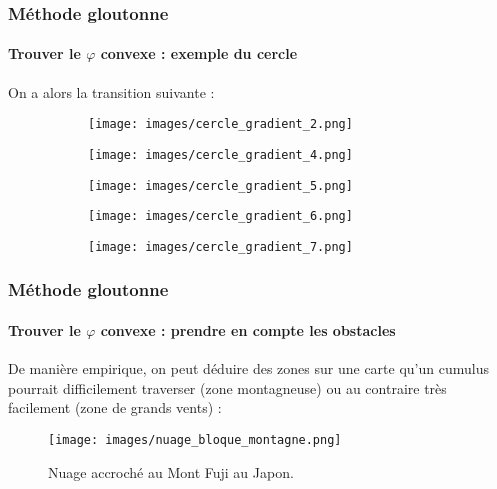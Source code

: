 \documentclass{beamer}
\begin{document}
\begin{frame}
	
		\frametitle{Méthode gloutonne}
		\framesubtitle{Trouver le $\varphi$ convexe : exemple du cercle}
		On a alors la transition suivante :
		\begin{figure}[!htb]
			\centering 
			\begin{subfigure}{0.25\textwidth}
				\centering 
				\texttt{[image: images/cercle\_gradient\_2.png]}
			\end{subfigure}
			\hspace*{\fill}
			\begin{subfigure}{0.25\textwidth}
				\centering 
				\texttt{[image: images/cercle\_gradient\_4.png]}
			\end{subfigure}
			\hspace*{\fill}
			\begin{subfigure}{0.25\textwidth}
				\centering 
				\texttt{[image: images/cercle\_gradient\_5.png]}
			\end{subfigure}
			\hspace*{\fill}
			
		\end{figure}
		\begin{figure}[!htb]

			\centering 
			\hspace*{\fill}
			\begin{subfigure}{0.25\textwidth}
				\centering 
				\texttt{[image: images/cercle\_gradient\_6.png]}
			\end{subfigure}
			\hspace*{\fill}
			\begin{subfigure}{0.25\textwidth}
				\centering 
				\texttt{[image: images/cercle\_gradient\_7.png]}
			\end{subfigure}
			\hspace*{\fill}
		\end{figure}


	
\end{frame}

\begin{frame}
	\frametitle{Méthode gloutonne}
	\framesubtitle{Trouver le $\varphi$ convexe : prendre en compte les obstacles}
		De manière empirique, on peut déduire des zones sur une carte qu'un cumulus pourrait difficilement traverser (zone montagneuse) ou au contraire très facilement (zone de grands vents) : 
		\begin{figure}[h!]
			\centering 
			\texttt{[image: images/nuage\_bloque\_montagne.png]}
			\caption{Nuage accroché au Mont Fuji au Japon.}
		\end{figure}
\end{frame}
\end{document}
